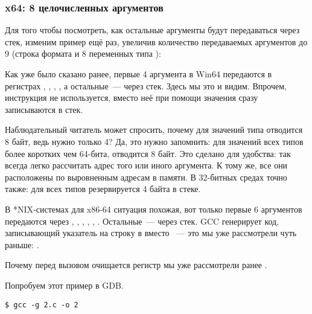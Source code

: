 \subsubsection{x64: 8 целочисленных аргументов}

\label{example_printf8_x64}
Для того чтобы посмотреть, как остальные аргументы будут передаваться через стек, 
изменим пример ещё раз, 
увеличив количество передаваемых аргументов до 9 
(строка формата \printf и 8 переменных типа \Tint):




Как уже было сказано ранее, первые 4 аргумента в Win64 передаются в регистрах \RCX, \RDX, , , а остальные~--- через стек.
Здесь мы это и видим.
Впрочем, инструкция \PUSH не используется, вместо неё при помощи \MOV значения сразу записываются в стек.



Наблюдательный читатель может спросить, почему для значений типа \Tint отводится 8 байт, ведь нужно только 4?
Да, это нужно запомнить: для значений всех типов более коротких чем 64-бита, отводится 8 байт.
Это сделано для удобства: так всегда легко рассчитать адрес того или иного аргумента.
К тому же, все они расположены по выровненным адресам в памяти.
В 32-битных средах точно также: для всех типов резервируется 4 байта в стеке.



В *NIX-системах для x86-64 ситуация похожая, вот только первые 6 аргументов передаются через
\RDI, \RSI, \RDX, \RCX, , .
Остальные~--- через стек.
GCC генерирует код, записывающий указатель на строку в \EDI вместо \RDI~--- 
это мы уже рассмотрели чуть раньше: .

Почему перед вызовом \printf очищается регистр \EAX мы уже рассмотрели ранее .




Попробуем этот пример в \ac{GDB}.

\begin{lstlisting}
$ gcc -g 2.c -o 2
\end{lstlisting}

